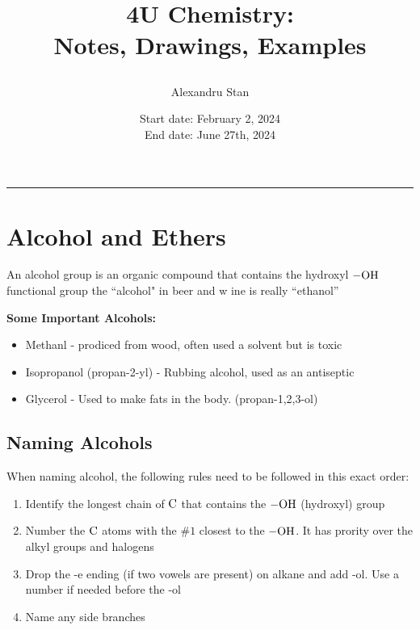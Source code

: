 \documentclass[12pt, a4paper]{article}
\title{
    \textbf{4U Chemistry:\\ Notes, Drawings, Examples}
    \author{Alexandru Stan}
    \date{Start date: February 2, 2024 \\ End date: June 27th, 2024}
}
\newcommand{\fline}{\par\noindent\rule{\textwidth}{0.1pt}}
\begin{document}
    \maketitle
    \vfill
    \newpage 

    \tableofcontents
    \fline
    \newpage

    \section{Alcohol and Ethers}

    An alcohol group is an organic compound that contains the hydroxyl $\ce{-OH}$ functional group
    the ``alcohol" in beer and w
    ine is really ``ethanol''

        

    \noindent\textbf{Some Important Alcohols:}
    \begin{itemize}
        \item Methanl - prodiced from wood, often used a solvent but is toxic
        \item Isopropanol (propan-2-yl) - Rubbing alcohol, used as an antiseptic
        \item Glycerol - Used to make fats in the body. (propan-1,2,3-ol)
    \end{itemize}

    \subsection{Naming Alcohols}

    When naming alcohol, the following rules need to be followed in this exact order:

    \begin{center}
        \begin{enumerate}
            \item Identify the longest chain of $\ce{C}$ that contains the $\ce{-OH}$ (hydroxyl) group
            \item Number the $\ce{C}$ atoms with the \#$1$ closest to the $\ce{-OH}$. It has prority over the alkyl 
                  groups and halogens
            \item Drop the -e ending (if two vowels are present) on alkane and add -ol. Use a number
                  if needed before the -ol
            \item Name any side branches %
    
        \end{enumerate}
    \end{center}
\end{document}

